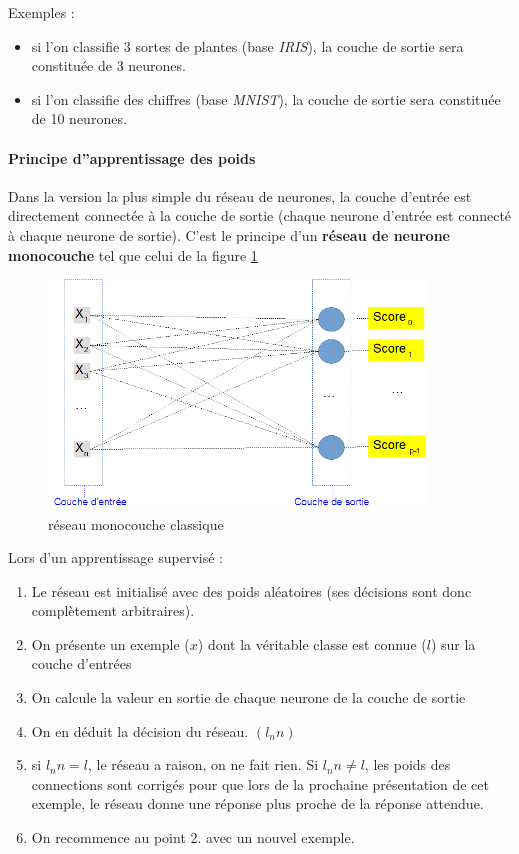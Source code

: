 Exemples :

\begin{itemize}
\tightlist
\item
  si l'on classifie 3 sortes de plantes (base \emph{IRIS}), la couche de
  sortie sera constituée de 3 neurones.
\item
  si l'on classifie des chiffres (base \emph{MNIST}), la couche de
  sortie sera constituée de 10 neurones.
\end{itemize}

\hypertarget{principe-dapprentissage-des-poids}{%
\paragraph{Principe d''apprentissage des
poids}\label{principe-dapprentissage-des-poids}}

Dans la version la plus simple du réseau de neurones, la couche d'entrée
est directement connectée à la couche de sortie (chaque neurone d'entrée
est connecté à chaque neurone de sortie). C'est le principe d'un
\textbf{réseau de neurone monocouche} tel que celui de la figure
\ref{fig:monocouche}

\begin{figure}[h!]
\label{fig:monocouche}
\centering
\includegraphics[width=10cm]{./images/monocouche.png}
\caption{réseau monocouche classique}
\end{figure}

Lors d'un apprentissage supervisé :

\begin{enumerate}
\def\labelenumi{\arabic{enumi}.}
\tightlist
\item
  Le réseau est initialisé avec des poids aléatoires (ses décisions sont
  donc complètement arbitraires).
\item
  On présente un exemple (\(x\)) dont la véritable classe est connue
  (\(l\)) sur la couche d'entrées
\item
  On calcule la valeur en sortie de chaque neurone de la couche de
  sortie
\item
  On en déduit la décision du réseau. \((l_nn)\)
\item
  si \(l_nn = l\), le réseau a raison, on ne fait rien. Si
  \(l_nn \neq l\), les poids des connections sont corrigés pour que lors
  de la prochaine présentation de cet exemple, le réseau donne une
  réponse plus proche de la réponse attendue.
\item
  On recommence au point 2. avec un nouvel exemple.
\end{enumerate}

